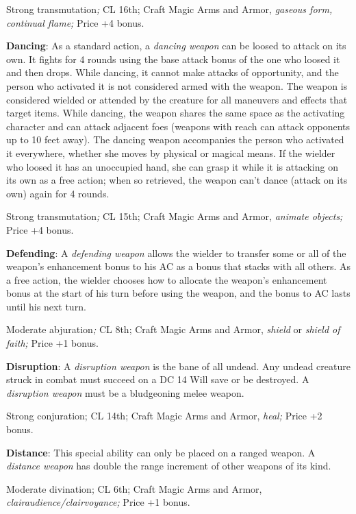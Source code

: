 Strong transmutation\textit{; }CL 16th; Craft Magic Arms and Armor, \textit{gaseous form, continual flame; }Price +4 bonus.
				
\textbf{Dancing}: As a standard action, a \textit{dancing weapon }can be loosed to attack on its own. It fights for 4 rounds using the base attack bonus of the one who loosed it and then drops. While dancing, it cannot make attacks of opportunity, and the person who activated it is not considered armed with the weapon. The weapon is considered wielded or attended by the creature for all maneuvers and effects that target items. While dancing, the weapon shares the same space as the activating character and can attack adjacent foes (weapons with reach can attack opponents up to 10 feet away). The dancing weapon accompanies the person who activated it everywhere, whether she moves by physical or magical means. If the wielder who loosed it has an unoccupied hand, she can grasp it while it is attacking on its own as a free action; when so retrieved, the weapon can't dance (attack on its own) again for 4 rounds.
				
Strong transmutation\textit{; }CL 15th; Craft Magic Arms and Armor, \textit{animate objects; }Price +4 bonus.
				
\textbf{Defending}: A \textit{defending weapon} allows the wielder to transfer some or all of the weapon's enhancement bonus to his AC as a bonus that stacks with all others. As a free action, the wielder chooses how to allocate the weapon's enhancement bonus at the start of his turn before using the weapon, and the bonus to AC lasts until his next turn.
				
Moderate abjuration\textit{; }CL 8th; Craft Magic Arms and Armor, \textit{shield }or \textit{shield of faith; }Price +1 bonus.
				
\textbf{Disruption}: A \textit{disruption weapon} is the bane of all undead. Any undead creature struck in combat must succeed on a DC 14 Will save or be destroyed. A \textit{disruption weapon} must be a bludgeoning melee weapon.
				
Strong conjuration; CL 14th; Craft Magic Arms and Armor, \textit{heal; }Price +2 bonus.
				
\textbf{Distance}: This special ability can only be placed on a ranged weapon. A \textit{distance weapon} has double the range increment of other weapons of its kind.
				
Moderate divination; CL 6th; Craft Magic Arms and Armor, \textit{clairaudience/clairvoyance; }Price +1 bonus.
				
